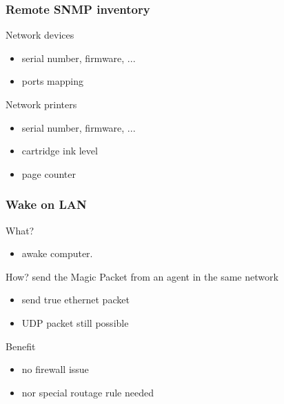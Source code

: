\begin{frame}
    \frametitle{Remote SNMP inventory}

    \begin{block}{Network devices}
        \begin{itemize}
            \item serial number, firmware, ...
            \item ports mapping
        \end{itemize}
    \end{block}

    \begin{block}{Network printers}
        \begin{itemize}
            \item serial number, firmware, ...
            \item cartridge ink level
            \item page counter
        \end{itemize}
    \end{block}
\end{frame}

\begin{frame}
    \frametitle{Wake on LAN}

    \begin{block}{What?}
    \begin{itemize}
        \item awake computer.
    \end{itemize}
    \end{block}

\pause

    \begin{block}{How?}
    send the Magic Packet from an agent in the same network
    \begin{itemize}
        \item send true ethernet packet
        \item UDP packet still possible
    \end{itemize}
    \end{block}

\pause

    \begin{block}{Benefit}
    \begin{itemize}
        \item no firewall issue
        \item nor special routage rule needed
    \end{itemize}
    \end{block}

\end{frame}

